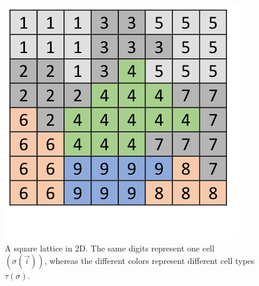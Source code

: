 \begin{figure}[th]
	\center
	\includegraphics[scale=0.4]{figures/2DSquareLattice.png}
	\caption[A two dimensional square lattice]{A square lattice in 2D. The same digits represent one cell $(\sigma(\vec{i}))$, whereas the different colors represent different cell types $\tau(\sigma)$.}
	\label{img:2DSquareLattice}
\end{figure}

